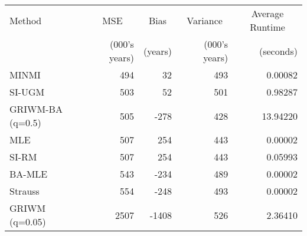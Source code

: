 
\begin{tabular}{lrrrr}
\toprule
\multicolumn{1}{l}{Method} & \multicolumn{1}{c}{MSE} & \multicolumn{1}{c}{Bias} & \multicolumn{1}{c}{Variance} & \multicolumn{1}{c}{Average Runtime} \\
 & (000's years) & (years) & (000's years) & (seconds)\\
\midrule
MINMI & 494 & 32 & 493 & 0.00082\\
SI-UGM & 503 & 52 & 501 & 0.98287\\
GRIWM-BA (q=0.5) & 505 & -278 & 428 & 13.94220\\
MLE & 507 & 254 & 443 & 0.00002\\
SI-RM & 507 & 254 & 443 & 0.05993\\
\addlinespace
BA-MLE & 543 & -234 & 489 & 0.00002\\
Strauss & 554 & -248 & 493 & 0.00002\\
GRIWM (q=0.05) & 2507 & -1408 & 526 & 2.36410\\
\bottomrule
\end{tabular}
